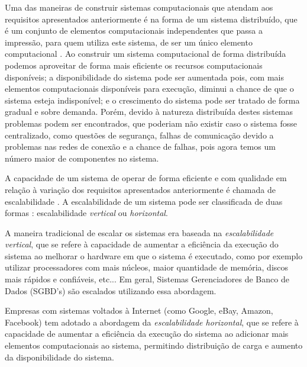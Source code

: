 \documentclass[a4paper,12pt]{report}
\begin{document}
Uma das maneiras de construir sistemas computacionais que atendam aos requisitos apresentados anteriormente é na forma de um sistema distribuído, que é um conjunto de elementos computacionais independentes que passa a impressão, para quem utiliza este sistema, de ser um único elemento computacional \cite{ds-tanenbaum}. Ao construir um sistema computacional de forma distribuída podemos aproveitar de forma mais eficiente os recursos computacionais disponíveis; a disponibilidade do sistema pode ser aumentada pois, com mais elementos computacionais disponíveis para execução, diminui a chance de que o sistema esteja indisponível; e o crescimento do sistema pode ser tratado de forma gradual e sobre demanda. Porém, devido à natureza distribuída destes sistemas problemas podem ser encontrados, que poderiam não existir caso o sistema fosse centralizado, como questões de segurança, falhas de comunicação devido a problemas nas redes de conexão e a chance de falhas, pois agora temos um número maior de componentes no sistema.

A capacidade de um sistema de operar de forma eficiente e com qualidade em relação à variação dos requisitos apresentados anteriormente é chamada de escalabilidade \cite{evaluating-scalability}. A escalabilidade de um sistema pode ser classificada de duas formas \cite{scale-up-vs-down}: escalabilidade {\em vertical} ou {\em horizontal}.

A maneira tradicional de escalar os sistemas era baseada na {\em escalabilidade vertical}, que se refere à capacidade de aumentar a eficiência da execução do sistema ao melhorar o hardware em que o sistema é executado, como por exemplo utilizar processadores com mais núcleos, maior quantidade de memória, discos mais rápidos e confiáveis, etc... Em geral, Sistemas Gerenciadores de Banco de Dados (SGBD's) são escalados utilizando essa abordagem.

Empresas com sistemas voltados à Internet (como Google, eBay, Amazon, Facebook) tem adotado a abordagem da {\em escalabilidade horizontal}, que se refere à capacidade de aumentar a eficiência da execução do sistema ao adicionar mais elementos computacionais ao sistema, permitindo distribuição de carga e aumento da disponibilidade do sistema.
\end{document}
